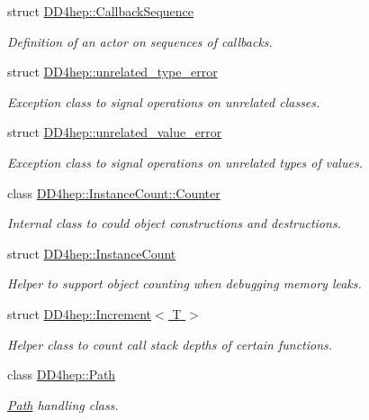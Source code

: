\begin{DoxyCompactItemize}
struct \hyperlink{struct_d_d4hep_1_1_callback_sequence}{D\+D4hep\+::\+Callback\+Sequence}
\begin{DoxyCompactList}\small\item\em Definition of an actor on sequences of callbacks. \end{DoxyCompactList}\item 
struct \hyperlink{struct_d_d4hep_1_1unrelated__type__error}{D\+D4hep\+::unrelated\+\_\+type\+\_\+error}
\begin{DoxyCompactList}\small\item\em Exception class to signal operations on unrelated classes. \end{DoxyCompactList}\item 
struct \hyperlink{struct_d_d4hep_1_1unrelated__value__error}{D\+D4hep\+::unrelated\+\_\+value\+\_\+error}
\begin{DoxyCompactList}\small\item\em Exception class to signal operations on unrelated types of values. \end{DoxyCompactList}\item 
class \hyperlink{class_d_d4hep_1_1_instance_count_1_1_counter}{D\+D4hep\+::\+Instance\+Count\+::\+Counter}
\begin{DoxyCompactList}\small\item\em Internal class to could object constructions and destructions. \end{DoxyCompactList}\item 
struct \hyperlink{struct_d_d4hep_1_1_instance_count}{D\+D4hep\+::\+Instance\+Count}
\begin{DoxyCompactList}\small\item\em Helper to support object counting when debugging memory leaks. \end{DoxyCompactList}\item 
struct \hyperlink{struct_d_d4hep_1_1_increment}{D\+D4hep\+::\+Increment$<$ T $>$}
\begin{DoxyCompactList}\small\item\em Helper class to count call stack depths of certain functions. \end{DoxyCompactList}\item 
class \hyperlink{class_d_d4hep_1_1_path}{D\+D4hep\+::\+Path}
\begin{DoxyCompactList}\small\item\em \hyperlink{class_d_d4hep_1_1_path}{Path} handling class. \end{DoxyCompactList}\item 

\end{DoxyCompactItemize}
